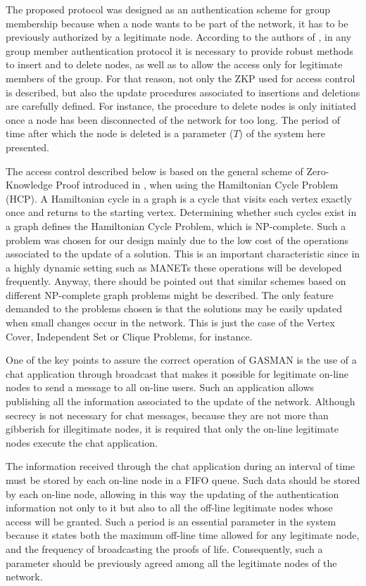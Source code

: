 \documentclass[conference]{IEEEtran}
\begin{document}
\label{BasicsandNotation}


The proposed protocol was designed as an authentication scheme for
group membership because when a node wants to be part of the
network, it has to be previously authorized by a legitimate node.
According to the authors of \cite{MAH00}, in any group member
authentication protocol it is necessary to provide robust methods
to insert and to delete nodes, as well as to allow the access only
for legitimate members of the group. For that reason, not only the
ZKP used for access control is described, but also the
update procedures associated to insertions and deletions are
carefully defined. For instance, the procedure to delete nodes is only initiated once a node has been
disconnected of the network for too long. The period of time after which the node is deleted is a parameter ($T$) of the system here presented.

The access control described below is based on the general scheme
of Zero-Knowledge Proof introduced in \cite{CH01}, when using the
Hamiltonian Cycle Problem (HCP). A Hamiltonian cycle in a graph is
a cycle that visits each vertex exactly once and returns to the
starting vertex. Determining whether such cycles exist in a graph
defines the Hamiltonian Cycle Problem, which is NP-complete. Such
a problem was chosen for our design mainly due to the low cost of
the operations associated to the update of a solution. This is an
important characteristic since in a highly dynamic setting such as
MANETs these operations will be developed frequently. Anyway,
there should be pointed out that similar schemes based on
different NP-complete graph problems might be described. The only
feature demanded to the problems chosen is that the solutions may
be easily updated when small changes occur in the network. This is
just the case of the Vertex Cover, Independent Set or Clique
Problems, for instance.

One of the key points to assure the correct operation of GASMAN is the use of a chat application through broadcast that
makes it possible for legitimate on-line nodes to send a message
to all on-line users. Such an application allows
publishing all the information associated to the update of the
network. Although secrecy is not necessary for chat messages, because they are not more than gibberish for illegitimate nodes, it is required that only the on-line legitimate nodes execute the chat application.

The information received through the chat application during an
interval of time must be stored by each on-line node in a FIFO
queue. Such data should be stored by each on-line node, allowing in this way the updating of
the authentication information not only to it but also to all the
off-line legitimate nodes whose access will be granted. Such a period is an essential
parameter in the system because it states both the maximum off-line time allowed
for any legitimate node, and the frequency of broadcasting the proofs
of life. Consequently, such a parameter should be previously
agreed among all the legitimate nodes of the network.
\end{document}
